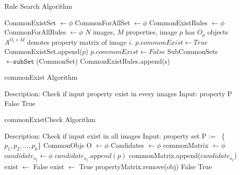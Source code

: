 \begin{algorithm}
	\caption{Rule Search Algorithm} 
	\begin{algorithmic}[1]
		\State CommonExistSet $ \leftarrow \phi $ 
		\State CommonForAllSet $ \leftarrow \phi $ 
		\State CommonExistRules $ \leftarrow \phi $ 
		\State CommonForAllRules $ \leftarrow \phi $ 
		\State $ N $ images, $ M $ properties, image $ p $ has $ O_p $ objects 
		\State $ A^{O_i \times M} $ denotes property matrix of image $ i $.
						\State $ p.commonExist \leftarrow True $
						\State CommonExistSet.append($ p $)
					\Else 
						\State $ p.commonExist\leftarrow False $
					\EndIf
				\EndFor 
			\EndFor
		\EndFor
		\State SubCommonSets $ \leftarrow \texttt{subSet}$(CommonSet)
				\State CommonExistRules.append(s) 
			\EndIf
		\EndFor

	\end{algorithmic} 
\end{algorithm}


\begin{algorithm}
	\caption{commonExist  Algorithm} 
	\begin{algorithmic}[1]
		\State Description: Check if input property exist in every images
		\State Input: property P
				\State \Return False
			\EndIf
		\EndFor
		\State \Return True
	\end{algorithmic} 
\end{algorithm}


\begin{algorithm}
	\caption{commonExistCheck Algorithm} 
	\begin{algorithmic}[1]
		\State Description: Check if input exist in all images
		\State Input: property set P :=  \{$ p_1, p_2,..., p_k $\}
		\State CommonObjs O $ \leftarrow \phi $
		\State Candidates $ \leftarrow \phi $ 
		\State commonMatrix $ \leftarrow \phi $
			\State $ candidate_{o_j} \leftarrow \phi $ 
					\State $ candidate_{o_j}.append(p) $
				\EndIf
			\EndFor 
			\State commonMatrix.append($ candidate_{o_j}$)
		\EndFor 
				\State exist $ \leftarrow $ False
						\State exist $ \leftarrow $ True
						\State propertyMatrix.remove(obj)
					\EndIf
				\EndFor 
					\State \Return False
				\EndIf
			\EndFor 
		\EndFor 
		\State \Return True
	\end{algorithmic} 
\end{algorithm}
